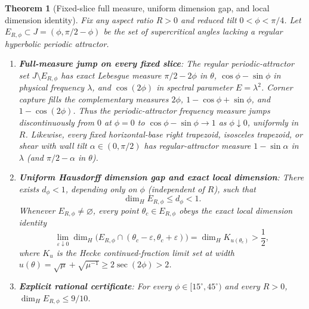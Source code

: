\documentclass[11pt,reqno]{amsart}
\newtheorem{theorem}{Theorem}[section]
\theoremstyle{definition}
\theoremstyle{remark}
\begin{document}
\begin{theorem}[Fixed-slice full measure, uniform dimension gap, and local dimension identity]\label{thm:measure-dim}
Fix any aspect ratio $R > 0$ and reduced tilt $0 < \phi < \pi/4$. Let $E_{R,\phi} \subset J = (\phi, \pi/2 - \phi)$ be the set of supercritical angles lacking a regular hyperbolic periodic attractor.
\begin{enumerate}
  \item \textbf{Full-measure jump on every fixed slice}: The regular periodic-attractor set $J \setminus E_{R,\phi}$ has exact Lebesgue measure $\pi/2 - 2\phi$ in $\theta$, $\cos\phi - \sin\phi$ in physical frequency $\lambda$, and $\cos(2\phi)$ in spectral parameter $E = \lambda^2$. Corner capture fills the complementary measures $2\phi$, $1 - \cos\phi + \sin\phi$, and $1 - \cos(2\phi)$. Thus the periodic-attractor frequency measure jumps discontinuously from $0$ at $\phi = 0$ to $\cos\phi - \sin\phi \to 1$ as $\phi \downarrow 0$, uniformly in $R$. Likewise, every fixed horizontal-base right trapezoid, isosceles trapezoid, or shear with wall tilt $\alpha \in (0,\pi/2)$ has regular-attractor measure $1 - \sin\alpha$ in $\lambda$ (and $\pi/2 - \alpha$ in $\theta$).
  \item \textbf{Uniform Hausdorff dimension gap and exact local dimension}: There exists $d_\phi < 1$, depending only on $\phi$ (independent of $R$), such that
  \begin{equation}\label{eq:dim-gap}
    \dim_H E_{R,\phi} \le d_\phi < 1.
  \end{equation}
  Whenever $E_{R,\phi} \ne \varnothing$, every point $\theta_c \in E_{R,\phi}$ obeys the exact local dimension identity
  \begin{equation}\label{eq:local-dim}
    \lim_{\varepsilon \downarrow 0} \dim_H\bigl(E_{R,\phi} \cap (\theta_c - \varepsilon, \theta_c + \varepsilon)\bigr) = \dim_H K_{u(\theta_c)} > \frac{1}{2},
  \end{equation}
  where $K_u$ is the Hecke continued-fraction limit set at width $u(\theta) = \sqrt{\mu} + \sqrt{\mu^{-1}} \ge 2\sec(2\phi) > 2$.
  \item \textbf{Explicit rational certificate}: For every $\phi \in [15^\circ, 45^\circ)$ and every $R > 0$, $\dim_H E_{R,\phi} \le 9/10$.
\end{enumerate}
\end{theorem}
\end{document}
